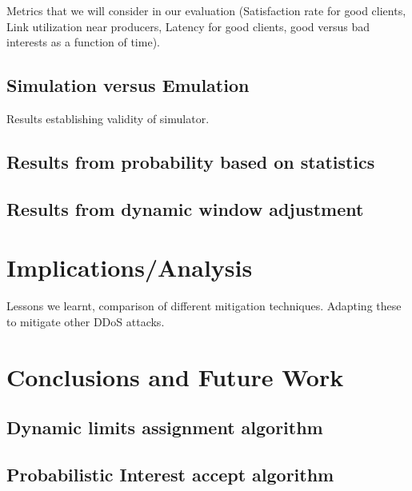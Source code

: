 \documentclass[conference]{IEEEtran}
\begin{document}
Metrics that we will consider in our evaluation (Satisfaction rate for good clients, Link utilization near producers, Latency for good clients, good versus bad interests as a function of time).

\subsection{Simulation versus Emulation}
Results establishing validity of  simulator.

\subsection{Results from probability based on statistics}

\subsection{Results from dynamic window adjustment}

\section{Implications/Analysis}
Lessons we learnt, comparison of different mitigation techniques. 
Adapting these to mitigate other DDoS attacks.

\section{Conclusions and Future Work}




\appendix



\subsection{Dynamic limits assignment algorithm}


\subsection{Probabilistic Interest accept algorithm}
\end{document}
